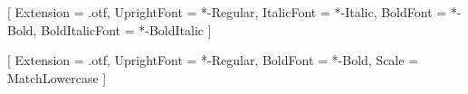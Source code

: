 \usepackage{fontspec}

\setmainfont{STIX2Text}[
Extension       = .otf,
UprightFont     = *-Regular,
ItalicFont      = *-Italic,
BoldFont        = *-Bold,
BoldItalicFont  = *-BoldItalic ]

\usepackage[math-style=ISO]{unicode-math}

\setsansfont[Scale=MatchLowercase]{TeX Gyre Heros}

\setmonofont{Inconsolatazi4}[
    Extension       = .otf,
    UprightFont     = *-Regular,
    BoldFont        = *-Bold,
    Scale = MatchLowercase ]

\usepackage{microtype}